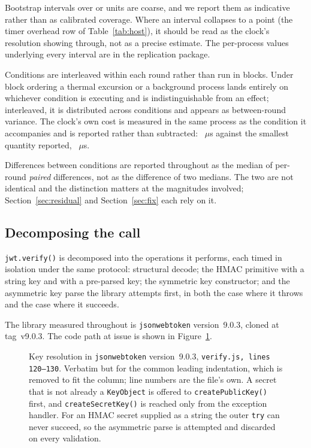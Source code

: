 \documentclass[preprint,12pt,authoryear]{elsarticle}
\newcommand{\LibraryName}{\texttt{jsonwebtoken}}
\newcommand{\LibraryVersion}{version~9.0.3}
\newcommand{\LibraryTag}{tag~v9.0.3}
\newcommand{\CodeFileLines}{verify.js, lines 120--130}
\newcommand{\CodeFirstLine}{120}
\begin{document}
Bootstrap intervals over \HostInvocations{} or \MatrixInvocations{} units are
coarse, and we report them as indicative rather than as calibrated coverage.
Where an interval collapses to a point (the timer overhead row of
Table~\ref{tab:host}), it should be read as the clock's resolution showing
through, not as a precise estimate. The per-process values underlying every
interval are in the replication package.

Conditions are interleaved within each round rather than run in blocks. Under
block ordering a thermal excursion or a background process lands entirely on
whichever condition is executing and is indistinguishable from an effect;
interleaved, it is distributed across conditions and appears as between-round
variance. The clock's own cost is measured in the same process as the condition
it accompanies and is reported rather than subtracted: \HostTimerOverhead~$\mu$s
against the smallest quantity reported, \HostCreateSecretKey~$\mu$s.

Differences between conditions are reported throughout as the median of
per-round \emph{paired} differences, not as the difference of two medians. The
two are not identical and the distinction matters at the magnitudes involved;
Section~\ref{sec:residual} and Section~\ref{sec:fix} each rely on it.

\subsection{Decomposing the call}\label{sec:decompose}

\texttt{jwt.verify()} is decomposed into the operations it performs, each timed
in isolation under the same protocol: structural decode; the HMAC primitive with
a string key and with a pre-parsed key; the symmetric key constructor; and the
asymmetric key parse the library attempts first, in both the case where it
throws and the case where it succeeds.

The library measured throughout is \LibraryName{} \LibraryVersion{}, cloned at
\LibraryTag. The code path at issue is shown in Figure~\ref{fig:codepath}.

\begin{figure}[!htbp]

\caption{Key resolution in \LibraryName{} \LibraryVersion{},
\texttt{\CodeFileLines}. Verbatim but for the common leading indentation,
which is removed to fit the column; line numbers are the file's own. A secret
that is not already a \texttt{KeyObject} is offered to
\texttt{createPublicKey()} first, and \texttt{createSecretKey()} is reached only
from the exception handler. For an HMAC secret supplied as a string the outer
\texttt{try} can never succeed, so the asymmetric parse is attempted and
discarded on every validation.}
\label{fig:codepath}
\end{figure}
\end{document}

